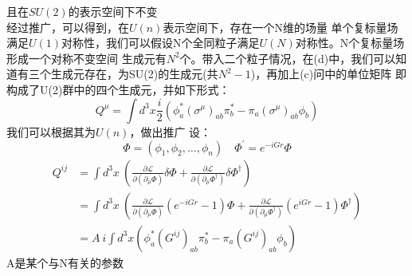 \documentclass{article}
\begin{document}
且在$SU(2)$的表示空间下不变 \\
经过推广，可以得到，在$U(n)$表示空间下，存在一个N维的场量
单个复标量场满足$U(1)$对称性，我们可以假设N个全同粒子满足$U(N)$对称性。N个复标量场形成一个对称不变空间
生成元有$N^2$个。带入二个粒子情况，在(d)中，我们可以知道有三个生成元存在，为SU(2)的生成元(共$N^2-1$)，再加上(c)问中的单位矩阵
即构成了U(2)群中的四个生成元，并如下形式：
$$Q^{\mu} =\int d^3 x  \frac{i}{2} \left( 
		\phi^{*}_{a} (\sigma^{\mu})_{ab} \pi^{*}_{b} - \pi_{a} (\sigma^{\mu})_{ab} \phi_{b} 								\right)$$
我们可以根据其为$U(n)$，做出推广
设：
$$
\Phi = (\phi_1, \phi_2, \ldots ,\phi_n) \quad \Phi^{\prime} = e^{-i G r} \Phi
$$
\begin{align}
Q^{ij} &= \int d^3 x \: (\frac{\partial \mathcal{L}}{\partial(\partial_{\mu} \Phi)} \delta \Phi +
		\frac{\partial \mathcal{L}}{\partial(\partial_{\mu} \Phi^{\dagger})} \delta \Phi^{\dagger} )\nonumber \\
		&=\int d^3 x \: (\frac{\partial \mathcal{L}}{\partial(\partial_{\mu} \Phi)} (e^{-i G r} - 1 )\Phi +
		\frac{\partial \mathcal{L}}{\partial(\partial_{\mu} \Phi^{\dagger})} (e^{i G r} - 1 ) \Phi^{\dagger}) \nonumber \\
       & = A \: i \int d^3 x \left( 
		\phi^{*}_{a} (G^{ij})_{ab} \pi^{*}_{b} - \pi_{a} (G^{ij})_{ab} \phi_{b} \right) \nonumber 
\end{align}
A是某个与N有关的参数
\end{document}
